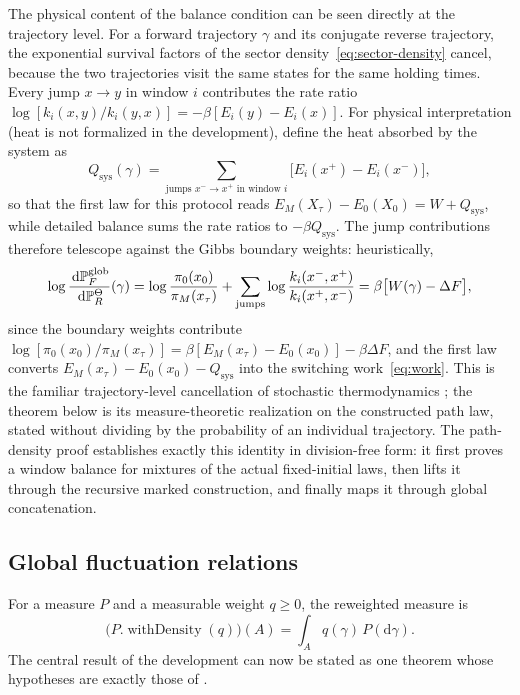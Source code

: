 The physical content of the balance condition can be seen directly at the trajectory level. For a forward trajectory $\gamma$ and its conjugate reverse trajectory, the exponential survival factors of the sector density~\eqref{eq:sector-density} cancel, because the two trajectories visit the same states for the same holding times. Every jump $x\to y$ in window $i$ contributes the rate ratio $\log[k_i(x,y)/k_i(y,x)]=-\beta[E_i(y)-E_i(x)]$. For physical interpretation (heat is not formalized in the development), define the heat absorbed by the system as
\[
  Q_{\mathrm{sys}}(\gamma)
  =\sum_{\text{jumps }x^-\to x^+\text{ in window }i}
   \bigl[E_i(x^+)-E_i(x^-)\bigr],
\]
so that the first law for this protocol reads $E_M(X_\tau)-E_0(X_0)=W+Q_{\mathrm{sys}}$, while detailed balance sums the rate ratios to $-\beta Q_{\mathrm{sys}}$. The jump contributions therefore telescope against the Gibbs boundary weights: heuristically,
\[
  \log\frac{\,\mathrm{d}\mathbb{P}_F^{\mathrm{glob}}}{\,\mathrm{d}\mathbb{P}_R^{\Theta}}(\gamma)
  = \log\frac{\pi_0(x_0)}{\pi_M(x_\tau)}
  +\sum_{\mathrm{jumps}}
   \log\frac{k_i(x^-,x^+)}{k_i(x^+,x^-)}
  = \beta\bigl[W(\gamma)-\Delta F\bigr],
\]
since the boundary weights contribute $\log[\pi_0(x_0)/\pi_M(x_\tau)]=\beta[E_M(x_\tau)-E_0(x_0)]-\beta\Delta F$, and the first law converts $E_M(x_\tau)-E_0(x_0)-Q_{\mathrm{sys}}$ into the switching work~\eqref{eq:work}. This is the familiar trajectory-level cancellation of stochastic thermodynamics \parencite{Crooks1999,Seifert2012,Maes2021}; the theorem below is its measure-theoretic realization on the constructed path law, stated without dividing by the probability of an individual trajectory. The path-density proof establishes exactly this identity in division-free form: it first proves a window balance for mixtures of the actual fixed-initial laws, then lifts it through the recursive marked construction, and finally maps it through global concatenation.

\subsection{Global fluctuation relations}

For a measure $P$ and a measurable weight $q\ge 0$, the reweighted measure is
\[
  \bigl(P.\operatorname{withDensity}(q)\bigr)(A)
  = \int_A q(\gamma)\,P(\mathrm{d}\gamma).
\]
The central result of the development can now be stated as one theorem whose hypotheses are exactly those of .

